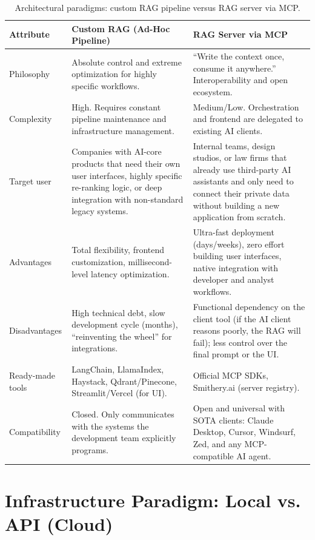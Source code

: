 \documentclass[11pt,a4paper]{article}
\begin{document}
\begin{table}[htbp]
\centering
\begingroup
\footnotesize
\setlength{\tabcolsep}{4pt}
\begin{tabular}{>{\raggedright\arraybackslash}p{2.0cm}>{\raggedright\arraybackslash}p{6.4cm}>{\raggedright\arraybackslash}p{6.4cm}}
\toprule
\textbf{Attribute} & \textbf{Custom RAG (Ad-Hoc Pipeline)} & \textbf{RAG Server via MCP} \\
\midrule
Philosophy & Absolute control and extreme optimization for highly specific workflows. & ``Write the context once, consume it anywhere.'' Interoperability and open ecosystem. \\
Complexity & High. Requires constant pipeline maintenance and infrastructure management. & Medium/Low. Orchestration and frontend are delegated to existing AI clients. \\
Target user & Companies with AI-core products that need their own user interfaces, highly specific re-ranking logic, or deep integration with non-standard legacy systems. & Internal teams, design studios, or law firms that already use third-party AI assistants and only need to connect their private data without building a new application from scratch. \\
Advantages & Total flexibility, frontend customization, millisecond-level latency optimization. & Ultra-fast deployment (days/weeks), zero effort building user interfaces, native integration with developer and analyst workflows. \\
Disadvantages & High technical debt, slow development cycle (months), ``reinventing the wheel'' for integrations. & Functional dependency on the client tool (if the AI client reasons poorly, the RAG will fail); less control over the final prompt or the UI. \\
Ready-made tools & LangChain, LlamaIndex, Haystack, Qdrant/Pinecone, Streamlit/Vercel (for UI). & Official MCP SDKs, Smithery.ai (server registry). \\
Compatibility & Closed. Only communicates with the systems the development team explicitly programs. & Open and universal with SOTA clients: Claude Desktop, Cursor, Windsurf, Zed, and any MCP-compatible AI agent. \\
\bottomrule
\end{tabular}
\endgroup
\caption{Architectural paradigms: custom RAG pipeline versus RAG server via MCP.}
\label{tab:arch}
\end{table}

\section{Infrastructure Paradigm: Local vs. API (Cloud)}
\label{sec:infra}
\end{document}
